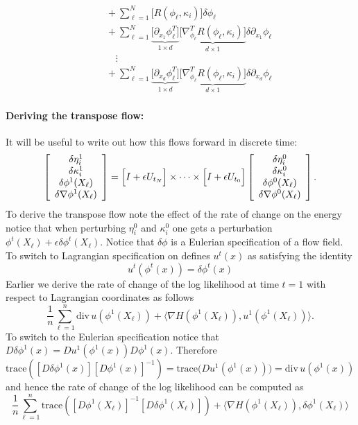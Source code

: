 \documentclass[noinfoline]{imsart}
\begin{document}
{\begin{align}
 &\quad+ \sum_{\ell=1}^N \bigl[R(\phi_\ell,\kappa_i)\bigr] \delta\phi_\ell \\
 &\quad+\sum_{\ell=1}^N\underbrace{\bigl[\partial_{x_1}{\phi}_\ell^T \bigr]}_{1 \times d}  \underbrace{\bigl[ \nabla^T_{\phi_\ell}R(\phi_\ell,\kappa_i)\bigr]}_{d\times 1}  \delta\partial_{x_1}\phi_\ell\\
 &\qquad\vdots \nonumber\\ 
&\quad+\sum_{\ell=1}^N\underbrace{\bigl[\partial_{x_d}{\phi}_\ell^T \bigr]}_{1 \times d}  \underbrace{\bigl[ \nabla^T_{\phi_\ell}R(\phi_\ell,\kappa_i)\bigr]}_{d\times 1}  \delta\partial_{x_d}\phi_\ell
\end{align}


\paragraph{Deriving the transpose flow:}
It will be useful to write out how this flows forward in discrete time:
\begin{equation} 
\label{forwardTT}
 \left[\begin{array}{c} \delta\eta^1_i\\ \delta \kappa^1_i \\ \delta\phi^1(X_\ell) \\ \delta \nabla\phi^1(X_\ell)   \end{array}\right]
 = \Bigl[I+\epsilon U_{t_N} \Bigr]\times \cdots \times  \Bigl[I+\epsilon U_{t_0} \Bigr]  \left[\begin{array}{c} \delta\eta^0_i\\ \delta \kappa^0_i \\ \delta\phi^0(X_\ell) \\ \delta \nabla\phi^0(X_\ell)   \end{array}\right].
\end{equation}
To derive the transpose flow note the effect of the rate of change on the energy notice that when perturbing $\eta^0_i$ and $\kappa^0_i$ one gets a perturbation  $\phi^t(X_\ell) +\epsilon \delta \phi^t(X_\ell)$. Notice that $\delta \phi$ is a Eulerian specification of a flow field.  To switch to Lagrangian specification on defines $u^t(x)$ as satisfying the identity
\[ u^t (\phi^t(x))=\delta \phi^t(x)\]
Earlier we derive the rate of change of the log likelihood at time $t=1$ with respect to Lagrangian coordinates as follows
\[  \frac{1}{n} \sum_{\ell=1}^n \text{div}\, u (\phi^1(X_\ell)) + \bigl\langle \nabla H (\phi^1(X_\ell)), u^1(\phi^1(X_\ell))\bigr\rangle.  \]
 To switch to the Eulerian specification notice that $D\delta \phi^1 (x) =  Du^1 (\phi^1(x)) D\phi^1(x) $. Therefore $\text{trace} ([D\delta \phi^1 (x)][ D\phi^1(x)]^{-1} ) = \text{trace}\bigl( Du^1 (\phi^1(x))\bigr)  =  \text{div}\, u (\phi^1(x))$ and hence the rate of change of the log likelihood can be computed as
\begin{equation} 
\label{Eulerian}
\frac{1}{n} \sum_{\ell=1}^n \text{trace} ([ D\phi^1(X_\ell)]^{-1} [D\delta \phi^1 (X_\ell)]) + \bigl\langle \nabla H (\phi^1(X_\ell)), \delta \phi^1(X_\ell)\bigr\rangle  
\end{equation}

}
\end{document}
